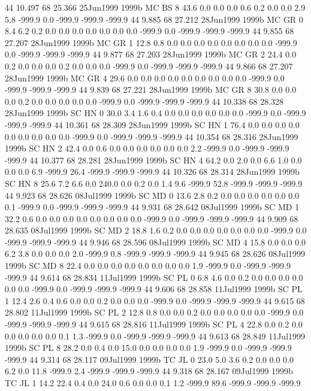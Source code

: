 44 10.497	68 25.366	25Jun1999	1999b	MC	BS	8	43.6	0.0	0.0	0.0	0.6	0.2	0.0	0.0	2.9	5.8	-999.9	0.0	-999.9	-999.9	-999.9
44 9.885	68 27.212	28Jun1999	1999b	MC	GR	0	8.4	6.2	0.2	0.0	0.0	0.0	0.0	0.0	0.0	0.0	-999.9	0.0	-999.9	-999.9	-999.9
44 9.855	68 27.207	28Jun1999	1999b	MC	GR	1	12.8	0.8	0.0	0.0	0.0	0.0	0.0	0.0	0.0	0.0	-999.9	0.0	-999.9	-999.9	-999.9
44 9.877	68 27.203	28Jun1999	1999b	MC	GR	2	24.4	0.0	0.2	0.0	0.0	0.0	0.2	0.0	0.0	0.0	-999.9	0.0	-999.9	-999.9	-999.9
44 9.866	68 27.207	28Jun1999	1999b	MC	GR	4	29.6	0.0	0.0	0.0	0.0	0.0	0.0	0.0	0.0	0.0	-999.9	0.0	-999.9	-999.9	-999.9
44 9.839	68 27.221	28Jun1999	1999b	MC	GR	8	30.8	0.0	0.0	0.0	0.2	0.0	0.0	0.0	0.0	0.0	-999.9	0.0	-999.9	-999.9	-999.9
44 10.338	68 28.328	28Jun1999	1999b	SC	HN	0	30.0	3.4	1.6	0.4	0.0	0.0	0.0	0.0	0.0	0.0	-999.9	0.0	-999.9	-999.9	-999.9
44 10.361	68 28.309	28Jun1999	1999b	SC	HN	1	76.4	0.0	0.0	0.0	0.0	0.0	0.0	0.0	0.0	0.0	-999.9	0.0	-999.9	-999.9	-999.9
44 10.354	68 28.316	28Jun1999	1999b	SC	HN	2	42.4	0.0	0.6	0.0	0.0	0.0	0.0	0.0	0.0	2.2	-999.9	0.0	-999.9	-999.9	-999.9
44 10.377	68 28.281	28Jun1999	1999b	SC	HN	4	64.2	0.0	2.0	0.0	6.6	1.0	0.0	0.0	0.0	6.9	-999.9	26.4	-999.9	-999.9	-999.9
44 10.326	68 28.314	28Jun1999	1999b	SC	HN	8	25.6	7.2	6.6	0.0	240.0	0.0	0.2	0.0	1.4	9.6	-999.9	52.8	-999.9	-999.9	-999.9
44 9.923	68 28.626	08Jul1999	1999b	SC	MD	0	13.6	2.8	0.2	0.0	0.0	0.0	0.0	0.0	0.0	0.1	-999.9	0.0	-999.9	-999.9	-999.9
44 9.931	68 28.642	08Jul1999	1999b	SC	MD	1	32.2	0.6	0.0	0.0	0.0	0.0	0.0	0.0	0.0	0.0	-999.9	0.0	-999.9	-999.9	-999.9
44 9.909	68 28.635	08Jul1999	1999b	SC	MD	2	18.8	1.6	0.2	0.0	0.0	0.0	0.0	0.0	0.0	0.0	-999.9	0.0	-999.9	-999.9	-999.9
44 9.946	68 28.596	08Jul1999	1999b	SC	MD	4	15.8	0.0	0.0	0.0	6.2	3.8	0.0	0.0	0.0	2.0	-999.9	0.8	-999.9	-999.9	-999.9
44 9.945	68 28.626	08Jul1999	1999b	SC	MD	8	22.4	0.0	0.0	0.0	0.0	0.0	0.0	0.0	0.0	1.9	-999.9	0.0	-999.9	-999.9	-999.9
44 9.614	68 28.834	11Jul1999	1999b	SC	PL	0	6.8	4.6	0.0	0.2	0.0	0.0	0.0	0.0	0.0	0.0	-999.9	0.0	-999.9	-999.9	-999.9
44 9.606	68 28.858	11Jul1999	1999b	SC	PL	1	12.4	2.6	0.4	0.6	0.0	0.0	0.2	0.0	0.0	0.0	-999.9	0.0	-999.9	-999.9	-999.9
44 9.615	68 28.802	11Jul1999	1999b	SC	PL	2	12.8	0.8	0.0	0.0	0.2	0.0	0.0	0.0	0.0	0.0	-999.9	0.0	-999.9	-999.9	-999.9
44 9.615	68 28.816	11Jul1999	1999b	SC	PL	4	22.8	0.0	0.2	0.0	0.0	0.0	0.0	0.0	0.1	1.3	-999.9	0.0	-999.9	-999.9	-999.9
44 9.613	68 28.849	11Jul1999	1999b	SC	PL	8	28.2	0.0	0.4	0.0	15.0	0.0	0.0	0.0	0.0	1.9	-999.9	0.0	-999.9	-999.9	-999.9
44 9.314	68 28.117	09Jul1999	1999b	TC	JL	0	23.0	5.0	3.6	0.2	0.0	0.0	0.0	6.2	0.0	11.8	-999.9	2.4	-999.9	-999.9	-999.9
44 9.318	68 28.167	09Jul1999	1999b	TC	JL	1	14.2	22.4	0.4	0.0	24.0	0.6	0.0	0.0	0.1	1.2	-999.9	89.6	-999.9	-999.9	-999.9

